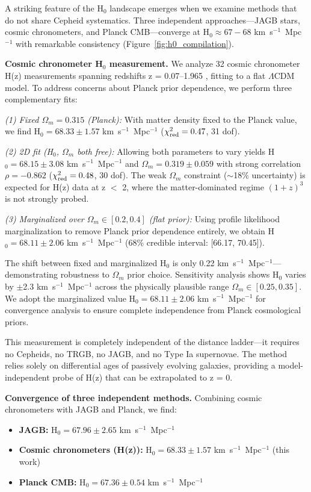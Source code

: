 \documentclass[twocolumn, linenumbers]{aastex701}
\begin{document}
A striking feature of the H$_0$ landscape emerges when we examine methods that do not share Cepheid systematics. Three independent approaches---JAGB stars, cosmic chronometers, and Planck CMB---converge at H$_0 \approx 67-68$ km~s$^{-1}$~Mpc$^{-1}$ with remarkable consistency (Figure~\ref{fig:h0_compilation}).

\textbf{Cosmic chronometer H$_0$ measurement.} We analyze 32 cosmic chronometer H(z) measurements spanning redshifts z = 0.07--1.965 \citep{Moresco2022}, fitting to a flat $\Lambda$CDM model. To address concerns about Planck prior dependence, we perform three complementary fits:

\textit{(1) Fixed $\Omega_m = 0.315$ (Planck):} With matter density fixed to the Planck value, we find H$_0 = 68.33 \pm 1.57$ km~s$^{-1}$~Mpc$^{-1}$ ($\chi^2_{\rm red} = 0.47$, 31 dof).

\textit{(2) 2D fit (H$_0$, $\Omega_m$ both free):} Allowing both parameters to vary yields H$_0 = 68.15 \pm 3.08$ km~s$^{-1}$~Mpc$^{-1}$ and $\Omega_m = 0.319 \pm 0.059$ with strong correlation $\rho = -0.862$ ($\chi^2_{\rm red} = 0.48$, 30 dof). The weak $\Omega_m$ constraint ($\sim$18\% uncertainty) is expected for H(z) data at z $<$ 2, where the matter-dominated regime $(1+z)^3$ is not strongly probed.

\textit{(3) Marginalized over $\Omega_m \in [0.2, 0.4]$ (flat prior):} Using profile likelihood marginalization to remove Planck prior dependence entirely, we obtain H$_0 = 68.11 \pm 2.06$ km~s$^{-1}$~Mpc$^{-1}$ (68\% credible interval: [66.17, 70.45]).

The shift between fixed and marginalized H$_0$ is only 0.22 km~s$^{-1}$~Mpc$^{-1}$---demonstrating robustness to $\Omega_m$ prior choice. Sensitivity analysis shows H$_0$ varies by $\pm$2.3 km~s$^{-1}$~Mpc$^{-1}$ across the physically plausible range $\Omega_m \in [0.25, 0.35]$. We adopt the marginalized value H$_0 = 68.11 \pm 2.06$ km~s$^{-1}$~Mpc$^{-1}$ for convergence analysis to ensure complete independence from Planck cosmological priors.

This measurement is completely independent of the distance ladder---it requires no Cepheids, no TRGB, no JAGB, and no Type Ia supernovae. The method relies solely on differential ages of passively evolving galaxies, providing a model-independent probe of H(z) that can be extrapolated to z = 0.

\textbf{Convergence of three independent methods.} Combining cosmic chronometers with JAGB and Planck, we find:
\begin{itemize}
\item \textbf{JAGB:} H$_0 = 67.96 \pm 2.65$ km~s$^{-1}$~Mpc$^{-1}$ \citep{Freedman2024}
\item \textbf{Cosmic chronometers (H(z)):} H$_0 = 68.33 \pm 1.57$ km~s$^{-1}$~Mpc$^{-1}$ (this work)
\item \textbf{Planck CMB:} H$_0 = 67.36 \pm 0.54$ km~s$^{-1}$~Mpc$^{-1}$ \citep{Planck2018}
\end{itemize}
\end{document}
